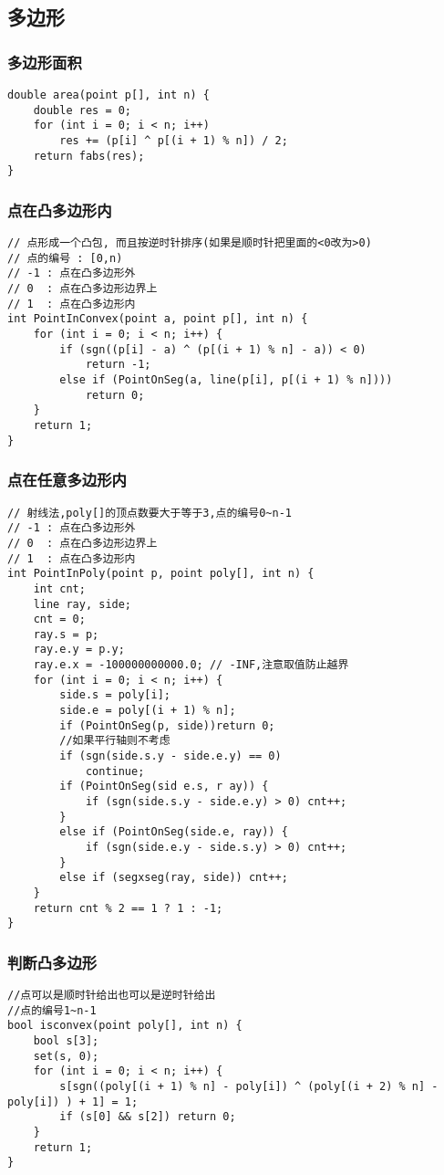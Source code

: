 \documentclass[a4paper]{article}
\begin{document}
\subsection{多边形}
\subsubsection{多边形面积}
\begin{lstlisting}
double area(point p[], int n) {
    double res = 0;
    for (int i = 0; i < n; i++)
        res += (p[i] ^ p[(i + 1) % n]) / 2;
    return fabs(res);
}
\end{lstlisting}
\subsubsection{点在凸多边形内}
\begin{lstlisting}
// 点形成一个凸包, 而且按逆时针排序(如果是顺时针把里面的<0改为>0)
// 点的编号 : [0,n)
// -1 : 点在凸多边形外
// 0  : 点在凸多边形边界上
// 1  : 点在凸多边形内
int PointInConvex(point a, point p[], int n) {
	for (int i = 0; i < n; i++) {
		if (sgn((p[i] - a) ^ (p[(i + 1) % n] - a)) < 0)
			return -1;
		else if (PointOnSeg(a, line(p[i], p[(i + 1) % n])))
			return 0;
	}
	return 1;
}
\end{lstlisting}
\subsubsection{点在任意多边形内}
\begin{lstlisting}
// 射线法,poly[]的顶点数要大于等于3,点的编号0~n-1
// -1 : 点在凸多边形外
// 0  : 点在凸多边形边界上
// 1  : 点在凸多边形内
int PointInPoly(point p, point poly[], int n) {
	int cnt;
	line ray, side;
	cnt = 0;
	ray.s = p;
	ray.e.y = p.y;
	ray.e.x = -100000000000.0; // -INF,注意取值防止越界
	for (int i = 0; i < n; i++) {
		side.s = poly[i];
		side.e = poly[(i + 1) % n];
		if (PointOnSeg(p, side))return 0;
		//如果平行轴则不考虑
		if (sgn(side.s.y - side.e.y) == 0)
			continue;
		if (PointOnSeg(sid e.s, r ay)) {
			if (sgn(side.s.y - side.e.y) > 0) cnt++;
		}
		else if (PointOnSeg(side.e, ray)) {
			if (sgn(side.e.y - side.s.y) > 0) cnt++;
		}
		else if (segxseg(ray, side)) cnt++;
	}
	return cnt % 2 == 1 ? 1 : -1;
}
\end{lstlisting}
\subsubsection{判断凸多边形}
\begin{lstlisting}
//点可以是顺时针给出也可以是逆时针给出
//点的编号1~n-1
bool isconvex(point poly[], int n) {
	bool s[3];
	set(s, 0);
	for (int i = 0; i < n; i++) {
		s[sgn((poly[(i + 1) % n] - poly[i]) ^ (poly[(i + 2) % n] - poly[i]) ) + 1] = 1;
		if (s[0] && s[2]) return 0;
	}
	return 1;
}
\end{lstlisting}
\end{document}
